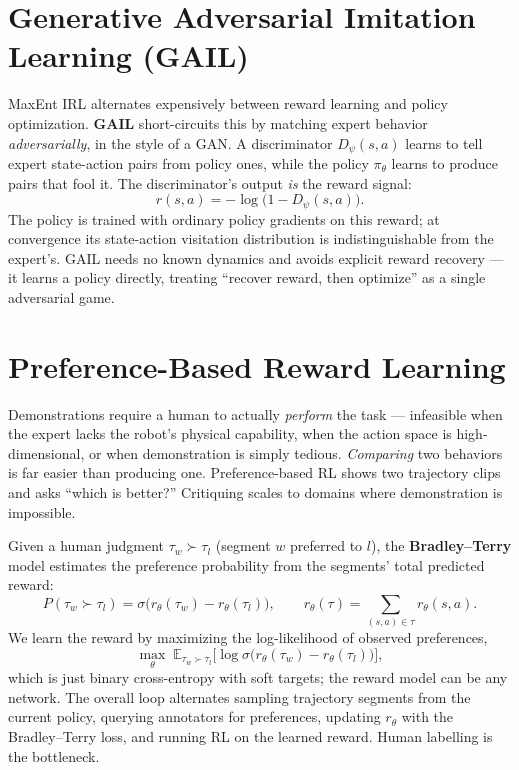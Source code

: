 \documentclass[11pt, oneside]{book}
\newcommand{\E}{\mathbb{E}}              %
\begin{document}
\section{Generative Adversarial Imitation Learning (GAIL)}

MaxEnt IRL alternates expensively between reward learning and policy optimization.
\textbf{GAIL} short-circuits this by matching expert behavior \emph{adversarially}, in the
style of a GAN. A discriminator $D_\psi(s,a)$ learns to tell expert state-action pairs
from policy ones, while the policy $\pi_\theta$ learns to produce pairs that fool it.
The discriminator's output \emph{is} the reward signal:
\[
  r(s,a) = -\log\bigl(1 - D_\psi(s,a)\bigr).
\]
The policy is trained with ordinary policy gradients on this reward; at convergence its
state-action visitation distribution is indistinguishable from the expert's. GAIL needs
no known dynamics and avoids explicit reward recovery --- it learns a policy directly,
treating ``recover reward, then optimize'' as a single adversarial game.

\section{Preference-Based Reward Learning}

Demonstrations require a human to actually \emph{perform} the task --- infeasible when the
expert lacks the robot's physical capability, when the action space is high-dimensional,
or when demonstration is simply tedious. \emph{Comparing} two behaviors is far easier than
producing one. Preference-based RL shows two trajectory clips and asks ``which is better?''
Critiquing scales to domains where demonstration is impossible.

Given a human judgment $\tau_w \succ \tau_l$ (segment $w$ preferred to $l$), the
\textbf{Bradley--Terry} model estimates the preference probability from the segments'
total predicted reward:
\[
  P(\tau_w \succ \tau_l) = \sigma\bigl(r_\theta(\tau_w) - r_\theta(\tau_l)\bigr),
  \qquad r_\theta(\tau) = \sum_{(s,a)\in\tau} r_\theta(s,a).
\]
We learn the reward by maximizing the log-likelihood of observed preferences,
\[
  \max_\theta\; \E_{\tau_w \succ \tau_l}\bigl[\log \sigma\bigl(r_\theta(\tau_w) - r_\theta(\tau_l)\bigr)\bigr],
\]
which is just binary cross-entropy with soft targets; the reward model can be any network.
The overall loop alternates sampling trajectory segments from the current policy, querying
annotators for preferences, updating $r_\theta$ with the Bradley--Terry loss, and running
RL on the learned reward. Human labelling is the bottleneck.
\end{document}
